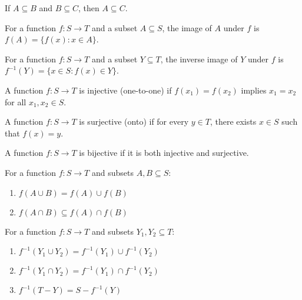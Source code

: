\begin{theorem}
If $A \subseteq B$ and $B \subseteq C$, then $A \subseteq C$.
\end{theorem}

\begin{definition}[Image]
For a function $f: S \to T$ and a subset $A \subseteq S$, the image of $A$ under $f$ is $f(A) = \{f(x) : x \in A\}$.
\end{definition}

\begin{definition}
For a function $f: S \to T$ and a subset $Y \subseteq T$, the inverse image of $Y$ under $f$ is $f^{-1}(Y) = \{x \in S : f(x) \in Y\}$.
\end{definition}

\begin{definition}
A function $f: S \to T$ is injective (one-to-one) if $f(x_1) = f(x_2)$ implies $x_1 = x_2$ for all $x_1, x_2 \in S$.
\end{definition}

\begin{definition}
A function $f: S \to T$ is surjective (onto) if for every $y \in T$, there exists $x \in S$ such that $f(x) = y$.
\end{definition}

\begin{definition}
A function $f: S \to T$ is bijective if it is both injective and surjective.
\end{definition}

\begin{theorem}
For a function $f: S \to T$ and subsets $A, B \subseteq S$:
\begin{enumerate}
\item $f(A \cup B) = f(A) \cup f(B)$
\item $f(A \cap B) \subseteq f(A) \cap f(B)$
\end{enumerate}
\end{theorem}

\begin{theorem}
For a function $f: S \to T$ and subsets $Y_1, Y_2 \subseteq T$:
\begin{enumerate}
\item $f^{-1}(Y_1 \cup Y_2) = f^{-1}(Y_1) \cup f^{-1}(Y_2)$
\item $f^{-1}(Y_1 \cap Y_2) = f^{-1}(Y_1) \cap f^{-1}(Y_2)$
\item $f^{-1}(T - Y) = S - f^{-1}(Y)$
\end{enumerate}
\end{theorem}

